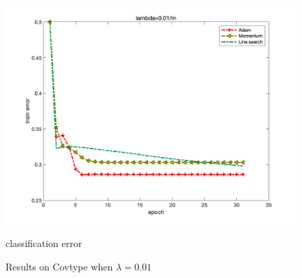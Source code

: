 \documentclass{article}
\begin{document}
\begin{figure}[H]
\begin{minipage}{0.33\linewidth}
		\centering
		\includegraphics[width=1\linewidth]{./fig/err_c4}
		\caption{classification error}
	\end{minipage}
	\caption*{Results on Covtype when $\lambda=0.01$}
\end{figure}
\maketitle
\nocite{*}
  

\end{document}
